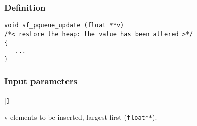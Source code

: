 \subsubsection*{Definition}
\begin{verbatim}
void sf_pqueue_update (float **v)
/*< restore the heap: the value has been altered >*/ 
{
   ... 
}
\end{verbatim}

\subsubsection*{Input parameters}
\begin{desclist}{\tt }{\quad}[\tt ]
   \setlength\itemsep{0pt}
   \item[v] elements to be inserted, largest first (\texttt{float**}).  
\end{desclist}





